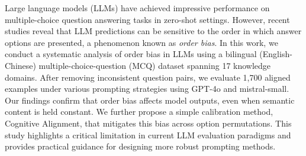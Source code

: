 Large language models (LLMs) have achieved impressive performance on multiple-choice question answering tasks in zero-shot settings. However, recent studies reveal that LLM predictions can be sensitive to the order in which answer options are presented, a phenomenon known as \textit{order bias}. In this work, we conduct a systematic analysis of order bias in LLMs using a bilingual (English-Chinese) multiple-choice-question (MCQ) dataset spanning 17 knowledge domains. After removing inconsistent question pairs, we evaluate 1,700 aligned examples under various prompting strategies using GPT-4o and mistral-small. Our findings confirm that order bias affects model outputs, even when semantic content is held constant. We further propose a simple calibration method, Cognitive Alignment, that mitigates this bias across option permutations. This study highlights a critical limitation in current LLM evaluation paradigms and provides practical guidance for designing more robust prompting methods.